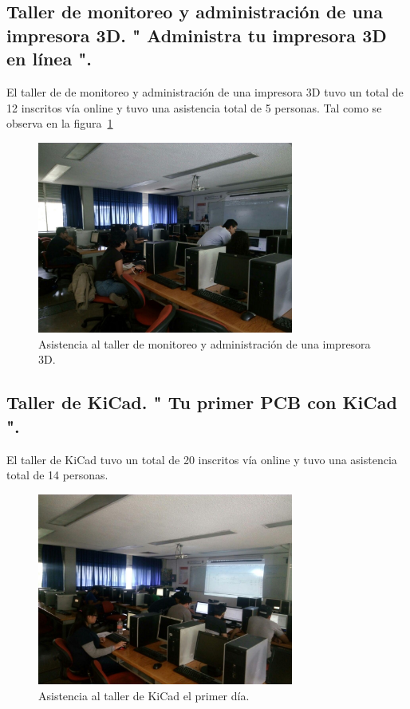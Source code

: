 \documentclass[a4paper,11pt]{article}                 %
\begin{document}
  \subsection{Taller de monitoreo y administración de una impresora 3D. " {Administra} tu impresora 3D en línea ".}   
  
El taller de de monitoreo y administración de una impresora 3D tuvo un total de 12 inscritos vía online y tuvo una asistencia total de 5 personas. Tal como se observa en la figura~\ref{fig:impresion-01}
       \begin{figure}[H]
    \begin{center}
      \includegraphics[width=0.75\textwidth]{images/impresion-01}
      \caption{Asistencia al taller de monitoreo y administración de una impresora 3D.}
      \label{fig:impresion-01}
    \end{center}
  \end{figure}
  
  \subsection{Taller de KiCad. " Tu primer PCB con KiCad ".}  
    El taller de KiCad tuvo un total de 20 inscritos vía online y tuvo una asistencia total de 14 personas.
       \begin{figure}[H]
    \begin{center}
      \includegraphics[width=0.75\textwidth]{images/kicad-01}
      \caption{Asistencia al taller de KiCad el primer día.}
      \label{fig:kicad-01}
    \end{center}
  \end{figure}   
  
\end{document}
